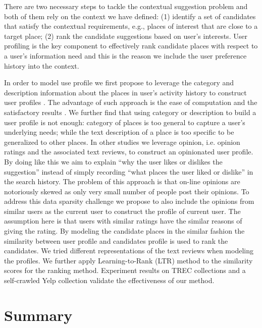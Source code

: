 There are two necessary steps to tackle the contextual suggestion problem 
and both of them rely on the context we have defined: 
(1) identify a set of candidates that satisfy the contextual 
requirements, e.g., places of interest that are close to a target place; 
(2) rank the candidate suggestions based on user's interests. 
User profiling is the key component to effectively rank candidate places 
with respect to a user's information need and this is the reason we include 
the user preference history into the context. 

In order to model use profile we first propose to leverage the 
category and description information about the places in user's activity 
history to construct user profiles \cite{udel:treccs2012}. 
The advantage of such approach is the ease of computation and the satisfactory 
results \cite{adriel:overview}. 
We further find that using category or description to build a user profile 
is not enough: category of places is too general to capture a user's 
underlying needs; while the text description of a place is too specific to 
be generalized to other places. 
In other studies 
\cite{udel:treccs2013,udel:treccs2014,udel:treccs2015,Yang:2013:OUP:2499178.2499191,Yang2015}
we leverage opinion, 
i.e. opinion ratings and the associated text reviews, to construct an 
opinionated user profile. By doing like this we aim to explain 
``why the user likes or dislikes the suggestion'' instead of simply recording 
``what places the user liked or dislike'' in the search history. 
The problem of this approach is that on-line opinions are notoriously skewed 
as only very small number of people post their opinions. 
To address this data sparsity challenge we propose to also include the 
opinions from similar users as the current user to construct the profile of 
current user. The assumption here is that users with similar ratings have 
the similar reasons of giving the rating. By modeling the candidate places 
in the similar fashion the similarity between user profile and candidates 
profile is used to rank the candidates. We tried different representations 
of the text reviews when modeling the profiles. We further apply 
Learning-to-Rank (LTR) method to the similarity scores for the ranking method. 
Experiment results on TREC collections and a self-crawled Yelp collection 
validate the effectiveness of our method.


\section{Summary}

